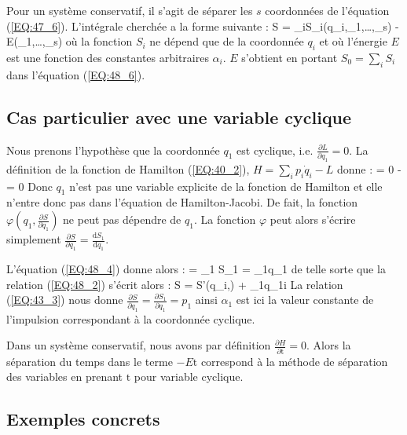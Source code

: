 Pour un syst\`{e}me conservatif, il s'agit de s\'{e}parer les $s$ coordonn\'{e}es de l'\'{e}quation (\ref{EQ:47_6}). L'int\'{e}grale cherch\'{e}e a la forme suivante :
\be
	S = \sum_{i}S_{i}(q_{i},\alpha_{1},\ldots,\alpha_{s}) - E(\alpha_{1},\ldots,\alpha_{s}) \label{EQ:48_6}
\ee
o\`{u} la fonction $S_{i}$ ne d\'{e}pend que de la coordonn\'{e}e $q_{i}$ et o\`{u} l'\'{e}nergie $E$ est une fonction des constantes arbitraires $\alpha_{i}$. $E$ s'obtient en portant $S_{0} = \sum_{i}S_{i}$ dans l'\'{e}quation (\ref{EQ:48_6}).

\subsection{Cas particulier avec une variable cyclique}\label{PAR:48_2}

Nous prenons l'hypoth\`{e}se que la coordonn\'{e}e $q_{1}$ est cyclique, i.e. $\frac{\partial L}{\partial q_{1}} = 0$. La d\'{e}finition de la fonction de Hamilton (\ref{EQ:40_2}), $H = \sum_{i}p_{i}\dot{q}_{i} - L$ donne :
\benn
	 = 0 -  = 0
\eenn
Donc $q_{1}$ n'est pas une variable explicite de la fonction de Hamilton et elle n'entre donc pas dans l'\'{e}quation de Hamilton-Jacobi. De fait, la fonction $\varphi\left(q_{1},\frac{\partial S}{\partial q_{1}}\right)$ ne peut pas d\'{e}pendre de $q_{1}$. La fonction $\varphi$ peut alors s'\'{e}crire simplement $\frac{\partial S}{\partial q_{1}} = \frac{\mathrm{d}S_{1}}{\mathrm{d}q_{1}}$.

L'\'{e}quation (\ref{EQ:48_4}) donne alors :
\benn
	 = \alpha_{1} \Leftrightarrow S_{1} = \alpha_{1}q_{1}
\eenn
de telle sorte que la relation (\ref{EQ:48_2}) s'\'{e}crit alors :
\be
	S = S'(q_{i},) + \alpha_{1}q_{1}i  \label{EQ:48_7}
\ee
La relation (\ref{EQ:43_3}) nous donne $\frac{\partial S}{\partial q_{1}} = \frac{\partial S_{1}}{\partial q_{1}} = p_{1}$ ainsi $\alpha_{1}$ est ici la valeur constante de l'impulsion correspondant \`{a} la coordonn\'{e}e cyclique.

Dans un syst\`{e}me conservatif, nous avons par d\'{e}finition $\frac{\partial H}{\partial\mathrm{t}} = 0$. Alors la s\'{e}paration du temps dans le terme $-E\mathrm{t}$ correspond \`{a} la m\'{e}thode de s\'{e}paration des variables en prenant $\mathrm{t}$ pour variable cyclique.

\subsection{Exemples concrets}\label{PAR:48_3}


